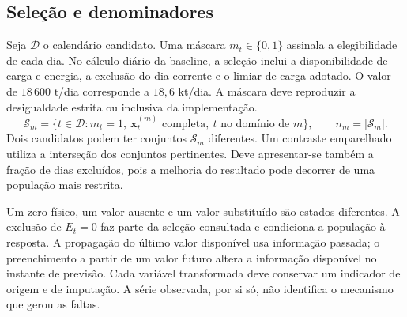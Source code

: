 \subsection{Seleção e denominadores}
\label{sec:mat-populacoes}
Seja $\mathcal D$ o calendário candidato. Uma máscara $m_t\in\{0,1\}$ assinala a elegibilidade de cada dia. No cálculo diário da baseline, a seleção inclui a disponibilidade de carga e energia, a exclusão do dia corrente e o limiar de carga adotado. O valor de $18\,600$ t/dia corresponde a $18{,}6$ kt/dia. A máscara deve reproduzir a desigualdade estrita ou inclusiva da implementação.
\begin{equation}
\mathcal S_m=\{t\in\mathcal D:m_t=1,\ \boldsymbol x_t^{(m)}\text{ completa},\ t\text{ no domínio de }m\},
\qquad n_m=|\mathcal S_m|.
\label{eq:mat-selecao}
\end{equation}
Dois candidatos podem ter conjuntos $\mathcal S_m$ diferentes. Um contraste emparelhado utiliza a interseção dos conjuntos pertinentes. Deve apresentar-se também a fração de dias excluídos, pois a melhoria do resultado pode decorrer de uma população mais restrita.

Um zero físico, um valor ausente e um valor substituído são estados diferentes. A exclusão de $E_t=0$ faz parte da seleção consultada e condiciona a população à resposta. A propagação do último valor disponível usa informação passada; o preenchimento a partir de um valor futuro altera a informação disponível no instante de previsão. Cada variável transformada deve conservar um indicador de origem e de imputação. A série observada, por si só, não identifica o mecanismo que gerou as faltas.


